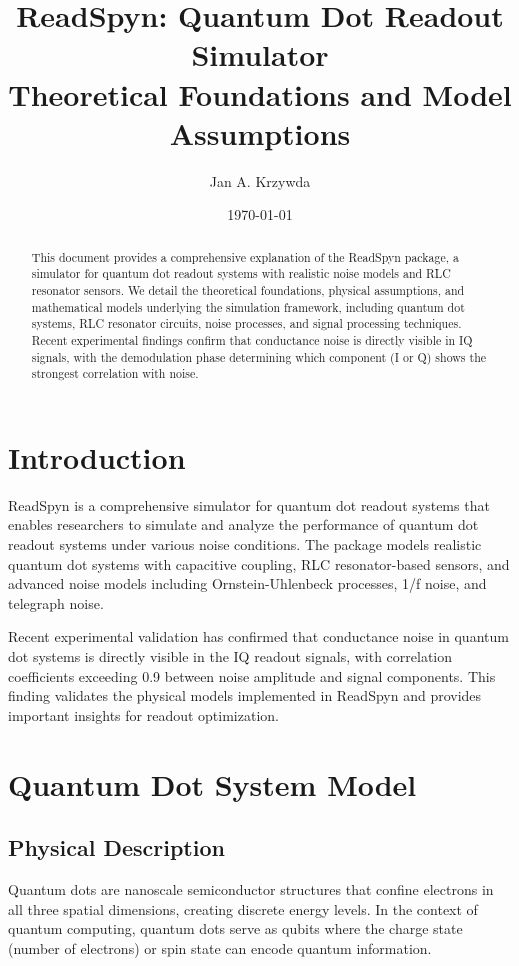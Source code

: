 \documentclass{article}
\title{ReadSpyn: Quantum Dot Readout Simulator\\
\large Theoretical Foundations and Model Assumptions}
\author{Jan A. Krzywda}
\date{\today}
\begin{document}
\maketitle

\begin{abstract}
This document provides a comprehensive explanation of the ReadSpyn package, a simulator for quantum dot readout systems with realistic noise models and RLC resonator sensors. We detail the theoretical foundations, physical assumptions, and mathematical models underlying the simulation framework, including quantum dot systems, RLC resonator circuits, noise processes, and signal processing techniques. Recent experimental findings confirm that conductance noise is directly visible in IQ signals, with the demodulation phase determining which component (I or Q) shows the strongest correlation with noise.
\end{abstract}

\tableofcontents
\newpage

\section{Introduction}

ReadSpyn is a comprehensive simulator for quantum dot readout systems that enables researchers to simulate and analyze the performance of quantum dot readout systems under various noise conditions. The package models realistic quantum dot systems with capacitive coupling, RLC resonator-based sensors, and advanced noise models including Ornstein-Uhlenbeck processes, 1/f noise, and telegraph noise.

Recent experimental validation has confirmed that conductance noise in quantum dot systems is directly visible in the IQ readout signals, with correlation coefficients exceeding 0.9 between noise amplitude and signal components. This finding validates the physical models implemented in ReadSpyn and provides important insights for readout optimization.

\section{Quantum Dot System Model}

\subsection{Physical Description}

Quantum dots are nanoscale semiconductor structures that confine electrons in all three spatial dimensions, creating discrete energy levels. In the context of quantum computing, quantum dots serve as qubits where the charge state (number of electrons) or spin state can encode quantum information.
\end{document}
